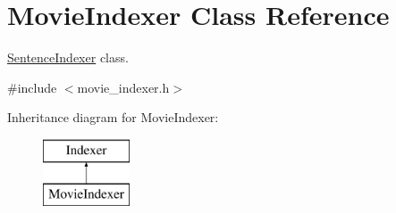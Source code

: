 \hypertarget{class_movie_indexer}{}\section{Movie\+Indexer Class Reference}
\label{class_movie_indexer}


\hyperlink{class_sentence_indexer}{Sentence\+Indexer} class.  




{\ttfamily \#include $<$movie\+\_\+indexer.\+h$>$}

Inheritance diagram for Movie\+Indexer\+:\begin{figure}[H]
\begin{center}
\leavevmode
\includegraphics[height=2.000000cm]{class_movie_indexer}
\end{center}
\end{figure}
